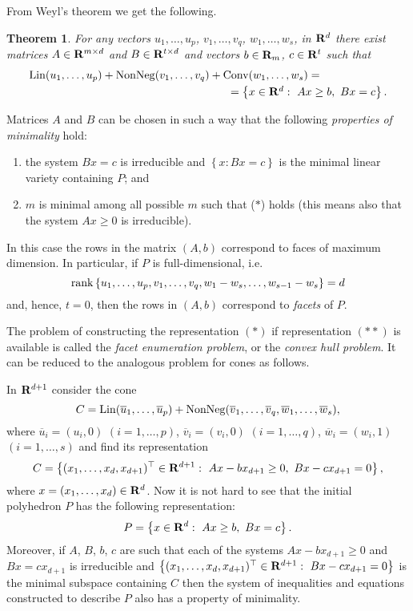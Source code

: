 \documentclass{article}
\newtheorem{theorem}{Theorem}
\newcommand{\RR}{{\rm\bf R}}
\newcommand{\Lin}{\mathop{\rm Lin}\nolimits}
\newcommand{\NonNeg}{\mathop{\rm NonNeg}\nolimits}
\newcommand{\Conv}{\mathop{\rm Conv}\nolimits}
\newcommand{\rank}{\mathop{\rm rank}\nolimits}
\newcommand{\set}[1]{\left\{ #1\right\}}
\newcommand{\transpose}{^{\top}}
\begin{document}
From Weyl's theorem we get the following.

\begin{theorem}
For any vectors
$u_1,\dots,u_p$, $v_1,\dots,v_q$, $w_1,\dots,w_s$,  in $\RR^d$ there exist matrices
$A\in \RR^{m\times d}$ and $B\in \RR^{t\times d}$ and vectors $b\in \RR_m$, $c\in \RR^t$ such that
$$
\begin{array}{r}
\Lin(u_1,\dots,u_p) + \NonNeg(v_1,\dots,v_q) + \Conv(w_1,\dots,w_s)=\qquad\qquad\qquad\\[.3em]
=\set{x\in\RR^d:~Ax\ge b,~Bx=c}.
\end{array}
$$
\end{theorem}


Matrices $A$ and $B$ can be chosen in such a way that 
the following {\em properties of minimality} hold:
\begin{enumerate}
  \item the system $Bx = c$ is irreducible and 
        $\set{x: Bx = c}$ is the minimal linear variety containing $P$; and
  \item $m$ is minimal among all possible $m$ such that ($*$)
        holds (this means also that the system $Ax \ge 0$ is irreducible).
\end{enumerate}
In this case the rows in the matrix $(A, b)$ correspond to faces of maximum dimension. In
particular, if $P$ is full-dimensional, i.e. 
$$\rank \set{u_1,\dots,u_p, v_1,\dots,v_q, w_1 - w_s,\dots,w_{s-1}-w_s} = d$$ 
and, hence, $t=0$, then the rows in $(A, b)$ 
correspond to {\em facets} of $P$.

The problem of constructing the representation $(*)$ if representation $(**)$ is available
is called
the {\em facet enumeration problem}, or the {\em convex hull problem}. 
It can be reduced to the analogous problem for cones as follows.

In $\RR^{d+1}$ consider the cone
$$
C=
\Lin(\overline{u}_1,\dots,\overline{u}_p) + 
\NonNeg(\overline{v}_1,\dots,\overline{v}_q, \overline{w}_1,\dots,\overline{w}_s),
$$
where 
$\overline{u}_i = (u_i, 0)$ $(i=1,\dots,p)$, 
$\overline{v}_i = (v_i, 0)$ $(i=1,\dots,q)$, 
$\overline{w}_i = (w_i, 1)$ $(i=1,\dots,s)$ 
and find its representation 
$$
C=\set{(x_1,\dots,x_d,x_{d+1})\transpose\in\RR^{d+1}:~ Ax-bx_{d+1} \ge 0, ~ Bx -cx_{d+1}= 0},
$$
where $x=(x_1,\dots,x_d)\in\RR^d$.
Now it is not hard to see that the initial polyhedron $P$ 
has the following representation:
$$
P=\set{x\in\RR^d:~Ax\ge b,~Bx= c}.
$$
Moreover, if $A$, $B$, $b$, $c$ are such that each of the systems
$Ax-bx_{d+1} \ge 0$ and $Bx = cx_{d+1}$ is irreducible and
$\set{(x_1,\dots,x_d,x_{d+1})\transpose\in\RR^{d+1}:~Bx -cx_{d+1}= 0}$ is
the minimal subspace containing $C$ then the system of inequalities and
equations constructed to describe $P$ also has a property of minimality.
\end{document}
